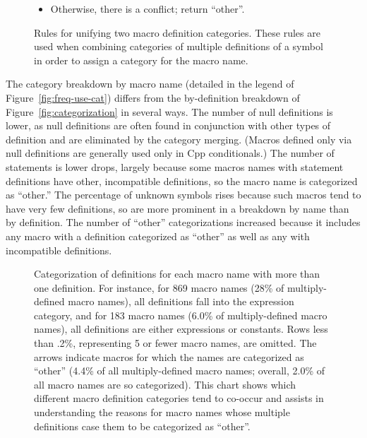 \documentclass[10pt]{article}
\newcommand{\captionsmall}[1]{\caption[]{\small #1}}
\begin{document}
\begin{figure}
\begin{itemize}
\item Otherwise, there is a conflict; return ``other''.
\end{itemize}


\captionsmall{Rules for unifying two macro definition categories.  These
  rules are used when combining categories of multiple definitions of a
  symbol in order to assign a category for the macro name.}
\label{fig:category-lub}
\end{figure}



The category breakdown by macro name (detailed in the legend of
Figure~\ref{fig:freq-use-cat}) differs from the by-definition breakdown of
Figure~\ref{fig:categorization} in several ways.  The number of null
definitions is lower, as null definitions are often found in conjunction
with other types of definition and are eliminated by the category merging.
(Macros defined only via null definitions are generally used only in Cpp
conditionals.)  The number of statements is lower drops, largely because
some macros names with statement definitions have other, incompatible
definitions, so the macro name is categorized as ``other.''  The percentage
of unknown symbols rises because such macros tend to have very few
definitions, so are more prominent in a breakdown by name than by
definition.  The number of ``other'' categorizations increased because it
includes any macro with a definition categorized as ``other'' as well as any
with incompatible definitions.


\begin{figure}
  {\small\centerline{}}
  
  \captionsmall{Categorization of definitions for each macro name with more
    than one definition.
    For instance, for 869 macro names (28\% of multiply-defined macro
    names), all definitions fall into the expression category, and for 183
    macro names (6.0\% of multiply-defined macro names), all definitions
    are either expressions or constants.
    Rows less than .2\%, representing 5 or fewer macro names, are omitted.
    The arrows indicate macros for which the
    names are categorized as ``other'' (4.4\% of all multiply-defined
    macro names; overall, 2.0\% of all macro names are so categorized).
    This chart shows which different macro definition categories tend
    to co-occur and assists in understanding the reasons for macro names
    whose multiple definitions case them to be categorized as ``other''.}

  \label{fig:subset-categories}
\end{figure}
\end{document}
